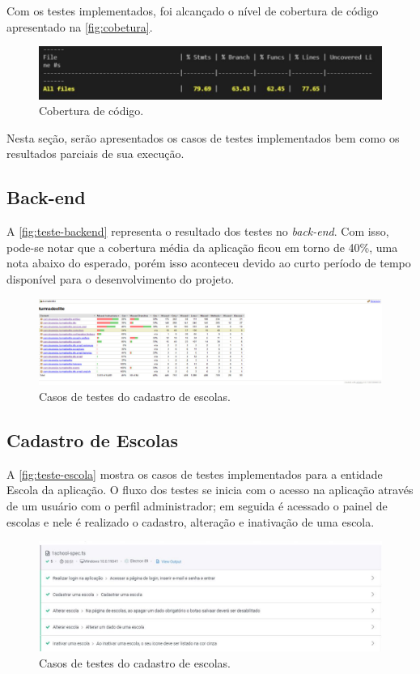 \documentclass[
    12pt,               %
    openright,          %
    oneside,
    a4paper,            %
    english,            %
    brazil              %
    ]{ifsp-spo-inf-ctds} %
\begin{document}
Com os testes implementados, foi alcançado o nível de cobertura de código apresentado na \autoref{fig:cobetura}.

\begin{figure}[htb]
    \centering
	\includegraphics[width=16cm]{imagens/Coberturadetestes.JPG}
	\caption{\label{fig:cobetura} Cobertura de código.}
\end{figure}

Nesta seção, serão apresentados os casos de testes implementados bem como os resultados parciais de sua execução.
\subsection{Back-end}
A \autoref{fig:teste-backend} representa o resultado dos testes no \textit{\gls{back-end}}. Com isso, pode-se notar que a cobertura média da aplicação ficou em torno de 40\%, uma nota abaixo do esperado, porém isso aconteceu devido ao curto período de tempo disponível para o desenvolvimento do projeto.
\begin{figure}[htb]
    \centering
	\includegraphics[width=16cm]{imagens/TesteBackend.jpg}
	\caption{\label{fig:teste-backend} Casos de testes do cadastro de escolas.}
\end{figure}

\subsection{Cadastro de Escolas}
A \autoref{fig:teste-escola} mostra os casos de testes implementados para a entidade Escola da aplicação. O fluxo dos testes se inicia com o acesso na aplicação através de um usuário com o perfil administrador; em seguida é acessado o painel de escolas e nele é realizado o cadastro, alteração e inativação de uma escola.


\begin{figure}[htb]
    \centering
	\includegraphics[width=16cm]{imagens/TesteEscola.JPG}
	\caption{\label{fig:teste-escola} Casos de testes do cadastro de escolas.}
\end{figure}
\end{document}
